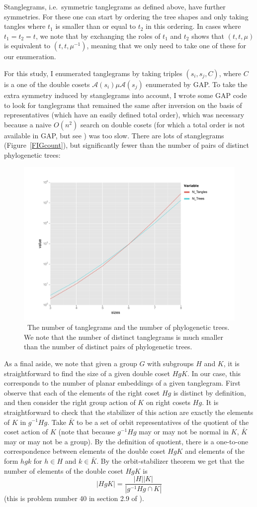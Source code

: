 \documentclass{amsart}
\newcommand{\aut}{\mathcal A}
\newcommand{\pairing}{\mu}
\newcommand{\arxiv}[1]{#1}
\newcommand{\FIGcount}{\
\label{FIGcount}
\begin{figure}
  \arxiv{\includegraphics[width=5in]{figures/count}}
\caption{\
  The number of tanglegrams and the number of phylogenetic trees.
  We note that the number of distinct tanglegrams is much smaller than the number of distinct pairs of phylogenetic trees.
}
\end{figure}
}
\begin{document}
Stanglegrams, i.e.\ symmetric tanglegrams as defined above, have further symmetries.
For these one can start by ordering the tree shapes and only taking tangles where $t_1$ is smaller than or equal to $t_2$ in this ordering.
In cases where $t_1 = t_2 = t$, we note that by exchanging the roles of $t_1$ and $t_2$ shows that $(t, t, \mu)$ is equivalent to $(t, t, \mu^{-1})$, meaning that we only need to take one of these for our enumeration.

For this study, I enumerated tanglegrams by taking triples $(s_i, s_j, C)$, where $C$ is a one of the double cosets $\aut(s_i) \pairing \aut(s_j)$ enumerated by GAP.
To take the extra symmetry induced by stanglegrams into account, I wrote some GAP code to look for tanglegrams that remained the same after inversion on the basis of representatives (which have an easily defined total order), which was necessary because a naive $O(n^2)$ search on double cosets (for which a total order is not available in GAP, but see \cite{Hulpke2003-em}) was too slow.
There are lots of stanglegrams (Figure~\ref{FIGcount}), but significantly fewer than the number of pairs of distinct phylogenetic trees:
\FIGcount

As a final aside, we note that given a group $G$ with subgroups $H$ and $K$, it is straightforward to find the size of a given double coset $HgK$.
In our case, this corresponds to the number of planar embeddings of a given tanglegram.
First observe that each of the elements of the right coset $Hg$ is distinct by definition, and then consider the right group action of $K$ on right cosets $Hg$.
It is straightforward to check that the stabilizer of this action are exactly the elements of $K$ in $g^{-1} H g$.
Take $\bar K$ to be a set of orbit representatives of the quotient of the coset action of $K$ (note that because $g^{-1} H g$ may or may not be normal in $K$, $\bar K$ may or may not be a group).
By the definition of quotient, there is a one-to-one correspondence between elements of the double coset $HgK$ and elements of the form $hgk$ for $h \in H$ and $k \in \bar K$.
By the orbit-stabilizer theorem we get that the number of elements of the double coset $HgK$ is
\begin{equation}
\label{eq:doubleCosetOrder}
|HgK| = \frac{|H| |K|}{|g^{-1} H g \cap K|}
\end{equation}
(this is problem number 40 in section 2.9 of \cite{herstein2006topics}).
\end{document}
